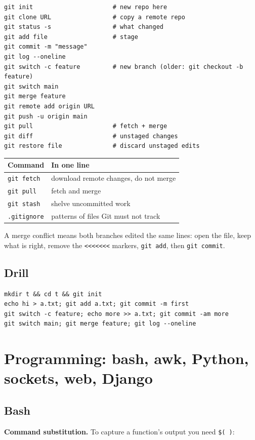 \documentclass[11pt,a4paper]{article}
\begin{document}
\begin{lstlisting}
git init                      # new repo here
git clone URL                 # copy a remote repo
git status -s                 # what changed
git add file                  # stage
git commit -m "message"
git log --oneline
git switch -c feature         # new branch (older: git checkout -b feature)
git switch main
git merge feature
git remote add origin URL
git push -u origin main
git pull                      # fetch + merge
git diff                      # unstaged changes
git restore file              # discard unstaged edits
\end{lstlisting}
\begin{center}\small\renewcommand{\arraystretch}{1.18}\setlength{\tabcolsep}{9pt}
\begin{tabularx}{\linewidth}{@{}l>{\raggedright\arraybackslash}X@{}}
\toprule
\textbf{\color{slate}Command} & \textbf{\color{slate}In one line} \\ \midrule
\texttt{git fetch} & download remote changes, do not merge \\
\texttt{git pull} & fetch and merge \\
\texttt{git stash} & shelve uncommitted work \\
\texttt{.gitignore} & patterns of files Git must not track \\
\bottomrule
\end{tabularx}\end{center}
A merge conflict means both branches edited the same lines: open the file, keep what is right, remove the \texttt{<<<<<<<} markers, \texttt{git add}, then \texttt{git commit}.

\subsection*{Drill}
\begin{lstlisting}
mkdir t && cd t && git init
echo hi > a.txt; git add a.txt; git commit -m first
git switch -c feature; echo more >> a.txt; git commit -am more
git switch main; git merge feature; git log --oneline
\end{lstlisting}
\clearpage
\section{Programming: bash, awk, Python, sockets, web, Django}
\subsection{Bash}
\textbf{Command substitution.} To capture a function's output you need \texttt{\$( )}:
\end{document}

